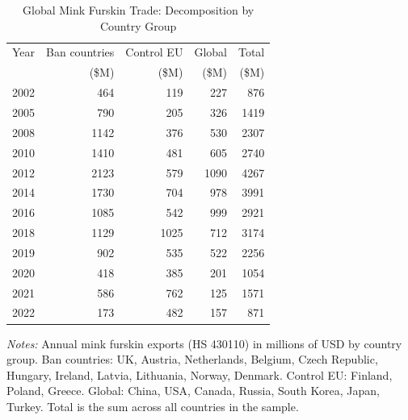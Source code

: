 \begin{table}[t]
\begin{threeparttable}
\centering
\caption{Global Mink Furskin Trade: Decomposition by Country Group}
\label{tab:global}
\begin{tabular}{lrrrr}
\toprule
Year & Ban countries & Control EU & Global & Total \\
 & (\$M) & (\$M) & (\$M) & (\$M) \\
\midrule
2002 & 464 & 119 & 227 & 876 \\
2005 & 790 & 205 & 326 & 1419 \\
2008 & 1142 & 376 & 530 & 2307 \\
2010 & 1410 & 481 & 605 & 2740 \\
2012 & 2123 & 579 & 1090 & 4267 \\
2014 & 1730 & 704 & 978 & 3991 \\
2016 & 1085 & 542 & 999 & 2921 \\
2018 & 1129 & 1025 & 712 & 3174 \\
2019 & 902 & 535 & 522 & 2256 \\
2020 & 418 & 385 & 201 & 1054 \\
2021 & 586 & 762 & 125 & 1571 \\
2022 & 173 & 482 & 157 & 871 \\
\bottomrule
\end{tabular}
\begin{tablenotes}
\item \textit{Notes:} Annual mink furskin exports (HS 430110) in millions of USD by country group. Ban countries: UK, Austria, Netherlands, Belgium, Czech Republic, Hungary, Ireland, Latvia, Lithuania, Norway, Denmark. Control EU: Finland, Poland, Greece. Global: China, USA, Canada, Russia, South Korea, Japan, Turkey. Total is the sum across all countries in the sample.
\end{tablenotes}
\end{threeparttable}
\end{table}
